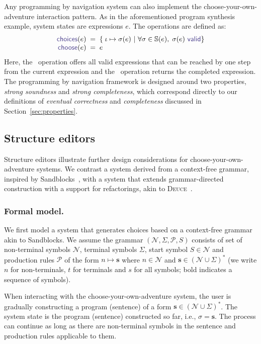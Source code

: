 \documentclass[nonacm,anonymous,sigplan,screen]{acmart}
\newcommand{\ident}[1]{\textsf{\color{DarkSlateBlue}{#1}}}
\newcommand{\select}{\textnormal{\ident{choose}}}
\newcommand{\choices}{\textnormal{\ident{choices}}}
\begin{document}
Any programming by navigation system can also implement the
choose-your-own-adventure interaction pattern. As in the aforementioned program synthesis
example, system states are expressions $e$. The operations are defined as:
\[
\begin{array}{r@{\;\;}c@{\;\;}l}
\choices(e) &=& \{\; \iota \mapsto \sigma(e) ~|~ \forall \sigma\in\mathbb{S}(e),\; \sigma(e)~\ident{valid} \}\\
\select(e) &=& e
\end{array}
\]
Here, the \choices\ operation offers all valid expressions that can be reached by one step
from the current expression and the \select\ operation returns the completed expression.
The programming by navigation framework is designed around two properties,
\emph{strong soundness} and \emph{strong completeness}, which correspond directly to our
definitions of \emph{eventual correctness} and \emph{completeness} discussed in
Section~\ref{sec:properties}.



\subsection{Structure editors}
\label{sec:examples-struct}

Structure editors illustrate further design considerations for
choose-your-own-adventure systems. We contrast a system
derived from a context-free grammar, inspired by Sandblocks~\cite{beckmann-2023-all},
with a system that extends grammar-directed construction with a
support for refactorings, akin to \textsc{Deuce}~\cite{hempel-2018-deuce}.

\subsubsection*{Formal model.}
We first model a system that generates choices based on a context-free grammar akin to Sandblocks.
We assume the grammar $(\mathcal{N},\Sigma,\mathcal{P},S)$ consists of set of
non-terminal symbols $\mathcal{N}$, terminal symbols $\Sigma$, start symbol $S\in\mathcal{N}$
and production rules $\mathcal{P}$ of the form $n\mapsto\boldsymbol{s}$ where
$n\in\mathcal{N}$ and $\boldsymbol{s}\in(\mathcal{N}\cup\Sigma)^{*}$ (we write $n$ for non-terminals,
$t$ for terminals and $s$ for all symbols; bold indicates a sequence of symbols).

When interacting with the choose-your-own-adventure system, the user is gradually constructing a
program (sentence) of a form $\boldsymbol{s}\in(\mathcal{N}\cup\Sigma)^{*}$. The system state is the program (sentence)
constructed so far, i.e., $\sigma = \boldsymbol{s}$. The process can continue
as long as there are non-terminal symbols in the sentence and production rules applicable to them.
\end{document}
